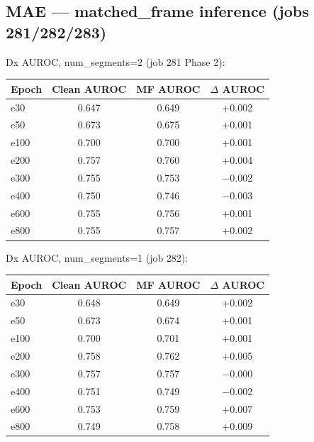 \documentclass{article}
\begin{document}
\subsection{MAE --- matched\_frame inference (jobs 281/282/283)}

Dx AUROC, num\_segments=2 (job 281 Phase 2):
\begin{center}
\begin{tabular}{lccc}
\toprule
Epoch & Clean AUROC & MF AUROC & $\Delta$ AUROC \\
\midrule
e30  & 0.647 & 0.649 & +0.002 \\
e50  & 0.673 & 0.675 & +0.001 \\
e100 & 0.700 & 0.700 & +0.001 \\
e200 & 0.757 & 0.760 & +0.004 \\
e300 & 0.755 & 0.753 & $-$0.002 \\
e400 & 0.750 & 0.746 & $-$0.003 \\
e600 & 0.755 & 0.756 & +0.001 \\
e800 & 0.755 & 0.757 & +0.002 \\
\bottomrule
\end{tabular}
\end{center}

Dx AUROC, num\_segments=1 (job 282):
\begin{center}
\begin{tabular}{lccc}
\toprule
Epoch & Clean AUROC & MF AUROC & $\Delta$ AUROC \\
\midrule
e30  & 0.648 & 0.649 & +0.002 \\
e50  & 0.673 & 0.674 & +0.001 \\
e100 & 0.700 & 0.701 & +0.001 \\
e200 & 0.758 & 0.762 & +0.005 \\
e300 & 0.757 & 0.757 & $-$0.000 \\
e400 & 0.751 & 0.749 & $-$0.002 \\
e600 & 0.753 & 0.759 & +0.007 \\
e800 & 0.749 & 0.758 & +0.009 \\
\bottomrule
\end{tabular}
\end{center}
\end{document}
